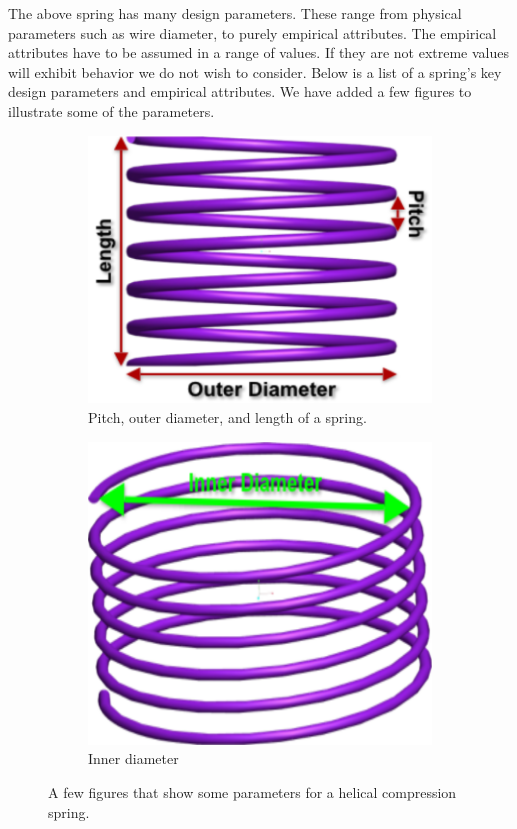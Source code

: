 \documentclass[10pt]{article}
\begin{document}
The above spring has many design parameters. These range from physical parameters such as wire diameter, to purely empirical attributes. The empirical attributes have to be assumed in a range of values. If they are not extreme values will exhibit behavior we do not wish to consider. Below is a list of a spring's key design parameters and empirical attributes. We have added a few figures to illustrate some of the parameters. \cite{Massad2015}		 
		\begin{figure}[h]
			\centering
			\begin{subfigure}{.5\textwidth}
				\includegraphics[scale=.2]{Spring_Description.png}
				\caption{Pitch, outer diameter, and length of a spring.}
				\label{Description1}
			\end{subfigure}%
			\begin{subfigure}{.5\textwidth}
				  \centering
		 		\includegraphics[scale=.2]{Spring_Description2.png}
				\caption{Inner diameter}
				  \label{Description2}
		  		
			\end{subfigure}
			 \label{Descriptions}
		  \caption{A few figures that show some parameters for a helical compression spring.}
		\end{figure}
		
\end{document}

